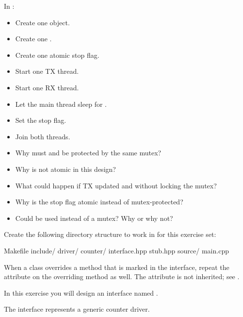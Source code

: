 \label{c6:ex:3.4}
In :
\begin{itemize}
  \item Create one  object.
  \item Create one .
  \item Create one atomic stop flag.
  \item Start one TX thread.
  \item Start one RX thread.
  \item Let the main thread sleep for .
  \item Set the stop flag.
  \item Join both threads.
\end{itemize}

\begin{itemize}
  \item Why must  and  be protected by the same mutex?
  \item Why is  not atomic in this design?
  \item What could happen if TX updated  and  without locking the mutex?
  \item Why is the stop flag atomic instead of mutex-protected?
  \item Could  be used instead of a mutex? Why or why not?
\end{itemize}

\label{c6:set:4}
Create the following directory structure to work in for this exercise set:

\begin{console}
Makefile
include/
    driver/
        counter/
            interface.hpp
            stub.hpp
source/
    main.cpp
\end{console}

\note When a class overrides a method that is marked \code{[[nodiscard]]} in the interface, repeat
the attribute on the overriding method as well. The attribute is not inherited; see
.

\label{c6:ex:4.1}
In this exercise you will design an interface named .

The interface represents a generic counter driver.

